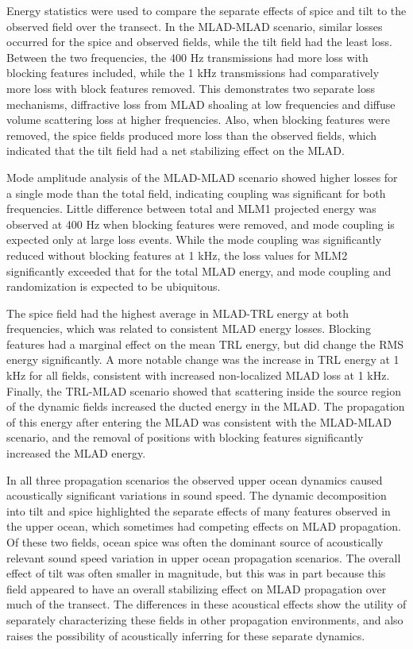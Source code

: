 \documentclass[preprint,NumberedRefs]{JASA}
\begin{document}
Energy statistics were used to compare the separate effects of spice and tilt to the observed field over the transect. In the MLAD-MLAD scenario, similar losses occurred for the spice and observed fields, while the tilt field had the least loss. Between the two frequencies, the 400 Hz transmissions had more loss with blocking features included, while the 1 kHz transmissions had comparatively more loss with block features removed. This demonstrates two separate loss mechanisms, diffractive loss from MLAD shoaling at low frequencies and diffuse volume scattering loss at higher frequencies\cite{colosi2020observations}. Also, when blocking features were removed, the spice fields produced more loss than the observed fields, which indicated that the tilt field had a net stabilizing effect on the MLAD.

Mode amplitude analysis of the MLAD-MLAD scenario showed higher losses for a single mode than the total field, indicating coupling was significant for both frequencies. Little difference between total and MLM1 projected energy was observed at 400 Hz when blocking features were removed, and mode coupling is expected only at large loss events. While the mode coupling was significantly reduced without blocking features at 1 kHz, the loss values for MLM2 significantly exceeded that for the total MLAD energy, and mode coupling and randomization is expected to be ubiquitous.

The spice field had the highest average in MLAD-TRL energy at both frequencies, which was related to consistent MLAD energy losses. Blocking features had a marginal effect on the mean TRL energy, but did change the RMS energy significantly. A more notable change was the increase in TRL energy at 1 kHz for all fields, consistent with increased non-localized MLAD loss at 1 kHz. Finally, the TRL-MLAD scenario showed that scattering inside the source region of the dynamic fields increased the ducted energy in the MLAD. The propagation of this energy after entering the MLAD was consistent with the MLAD-MLAD scenario, and the removal of positions with blocking features significantly increased the MLAD energy.

In all three propagation scenarios the observed upper ocean dynamics caused acoustically significant variations in sound speed. The dynamic decomposition into tilt and spice highlighted the separate effects of many features observed in the upper ocean, which sometimes had competing effects on MLAD propagation. Of these two fields, ocean spice was often the dominant source of acoustically relevant sound speed variation in upper ocean propagation scenarios. The overall effect of tilt was often smaller in magnitude, but this was in part because this field appeared to have an overall stabilizing effect on MLAD propagation over much of the transect. The differences in these acoustical effects show the utility of separately characterizing these fields in other propagation environments, and also raises the possibility of acoustically inferring for these separate dynamics.



\end{document}
